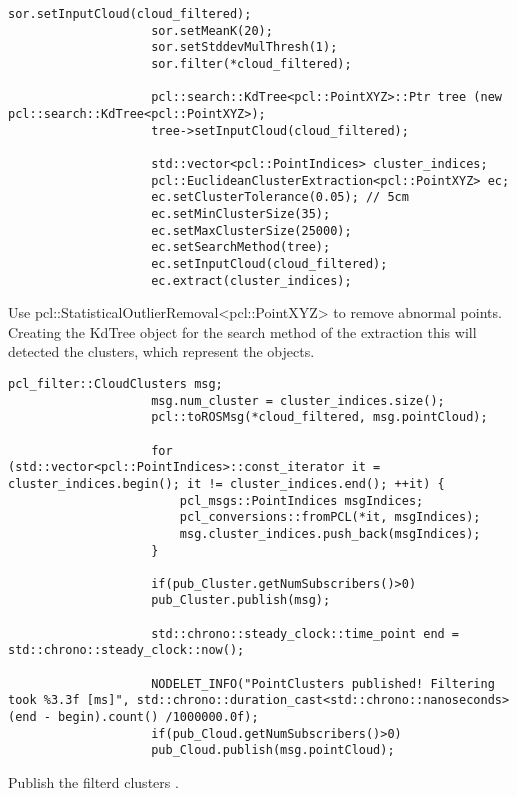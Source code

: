 				
				\begin{lstlisting}[caption={}]
					sor.setInputCloud(cloud_filtered);
					sor.setMeanK(20);
					sor.setStddevMulThresh(1);
					sor.filter(*cloud_filtered);
					
					pcl::search::KdTree<pcl::PointXYZ>::Ptr tree (new pcl::search::KdTree<pcl::PointXYZ>);
					tree->setInputCloud(cloud_filtered);
					
					std::vector<pcl::PointIndices> cluster_indices;
					pcl::EuclideanClusterExtraction<pcl::PointXYZ> ec;
					ec.setClusterTolerance(0.05); // 5cm
					ec.setMinClusterSize(35);
					ec.setMaxClusterSize(25000);
					ec.setSearchMethod(tree);
					ec.setInputCloud(cloud_filtered);
					ec.extract(cluster_indices);
				\end{lstlisting}
				
				
				Use pcl::StatisticalOutlierRemoval<pcl::PointXYZ> to remove abnormal points.\\
				Creating the KdTree object for the search method of the extraction this will detected the clusters, which represent the objects.
				\begin{lstlisting}[caption={}]
					pcl_filter::CloudClusters msg;
					msg.num_cluster = cluster_indices.size();
					pcl::toROSMsg(*cloud_filtered, msg.pointCloud);
					
					for (std::vector<pcl::PointIndices>::const_iterator it = cluster_indices.begin(); it != cluster_indices.end(); ++it) {
						pcl_msgs::PointIndices msgIndices;
						pcl_conversions::fromPCL(*it, msgIndices);
						msg.cluster_indices.push_back(msgIndices);
					}
					
					if(pub_Cluster.getNumSubscribers()>0)
					pub_Cluster.publish(msg);
					
					std::chrono::steady_clock::time_point end = std::chrono::steady_clock::now();
					
					NODELET_INFO("PointClusters published! Filtering took %3.3f [ms]", std::chrono::duration_cast<std::chrono::nanoseconds>(end - begin).count() /1000000.0f);
					if(pub_Cloud.getNumSubscribers()>0)
					pub_Cloud.publish(msg.pointCloud);
				\end{lstlisting}
				Publish the filterd clusters .\\
				
				
				
				
				
